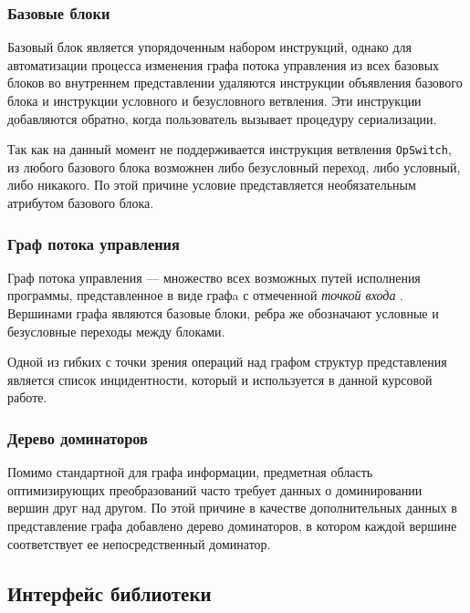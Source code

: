 \documentclass[14pt]{extarticle}
\begin{document}
\subsubsection{Базовые блоки}
Базовый блок является упорядоченным набором инструкций, однако для автоматизации процесса изменения графа потока управления из всех базовых блоков во внутреннем представлении удаляются инструкции объявления базового блока и инструкции условного и безусловного ветвления. Эти инструкции добавляются обратно, когда пользователь вызывает процедуру сериализации. 

Так как на данный момент не поддерживается инструкция ветвления \texttt{OpSwitch}, из любого базового блока возможнен либо безусловный переход, либо условный, либо никакого. По этой причине условие представляется необязательным атрибутом базового блока.

\subsubsection{Граф потока управления}
Граф потока управления --- множество всех возможных путей исполнения программы, представленное в виде графa с отмеченной \emph{точкой входа} \cite{cfg70}. Вершинами графа являются базовые блоки, ребра же обозначают условные и безусловные переходы между блоками.

Одной из гибких с точки зрения операций над графом структур представления является список инцидентности, который и используется в данной курсовой работе.


\subsubsection{Дерево доминаторов}
Помимо стандартной для графа информации, предметная область оптимизирующих преобразований часто требует данных о доминировании вершин друг над другом. По этой причине в качестве дополнительных данных в представление графа добавлено дерево доминаторов, в котором каждой вершине соответствует ее непосредственный доминатор.

\subsection{Интерфейс библиотеки}
\end{document}
